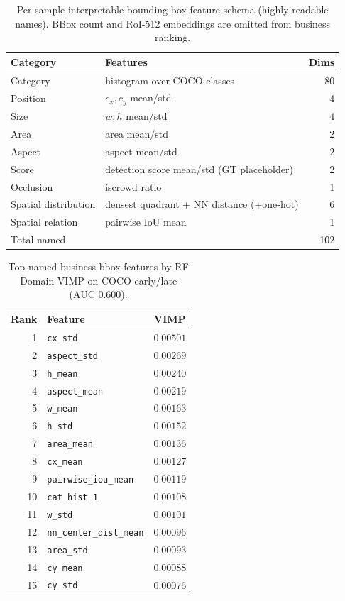 
\begin{table}[ht]
\centering
\caption{Per-sample interpretable bounding-box feature schema (highly readable names). BBox count and RoI-512 embeddings are omitted from business ranking.}
\label{tab:bbox-business-schema}
\small
\begin{tabular}{@{}l l r@{}}
\toprule
Category & Features & Dims \\
\midrule
Category & histogram over COCO classes & 80 \\
Position & $c_x,c_y$ mean/std & 4 \\
Size & $w,h$ mean/std & 4 \\
Area & area mean/std & 2 \\
Aspect & aspect mean/std & 2 \\
Score & detection score mean/std (GT placeholder) & 2 \\
Occlusion & iscrowd ratio & 1 \\
Spatial distribution & densest quadrant + NN distance (+one-hot) & 6 \\
Spatial relation & pairwise IoU mean & 1 \\
\midrule
Total named & & 102 \\
\bottomrule
\end{tabular}
\end{table}

\begin{table}[ht]
\centering
\caption{Top named business bbox features by RF Domain VIMP on COCO early/late (AUC $0.600$).}
\label{tab:bbox-business-rank}
\small
\begin{tabular}{@{}r l c@{}}
\toprule
Rank & Feature & VIMP \\
\midrule
1 & \texttt{cx\_std} & $0.00501$ \\
2 & \texttt{aspect\_std} & $0.00269$ \\
3 & \texttt{h\_mean} & $0.00240$ \\
4 & \texttt{aspect\_mean} & $0.00219$ \\
5 & \texttt{w\_mean} & $0.00163$ \\
6 & \texttt{h\_std} & $0.00152$ \\
7 & \texttt{area\_mean} & $0.00136$ \\
8 & \texttt{cx\_mean} & $0.00127$ \\
9 & \texttt{pairwise\_iou\_mean} & $0.00119$ \\
10 & \texttt{cat\_hist\_1} & $0.00108$ \\
11 & \texttt{w\_std} & $0.00101$ \\
12 & \texttt{nn\_center\_dist\_mean} & $0.00096$ \\
13 & \texttt{area\_std} & $0.00093$ \\
14 & \texttt{cy\_mean} & $0.00088$ \\
15 & \texttt{cy\_std} & $0.00076$ \\
\bottomrule
\end{tabular}
\end{table}

